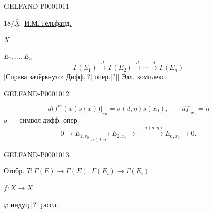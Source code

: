 \begin{GelfandAdjacentEvidence}{GELFAND-P000101}{1}

$18/\overline{\underline X}$. \underline{И.М. Гельфанд.}
\par\hspace*{4mm}$X$

$E_1,\ldots,E_n$
\begin{equation*}
\Gamma(E_1)\overset d\longrightarrow\Gamma(E_2)
\overset d\longrightarrow\cdots\overset d\longrightarrow\Gamma(E_n)
\end{equation*}
[Справа зачёркнуто: Дифф.[?] опер.[?]] Элл. комплекс.
\end{GelfandAdjacentEvidence}
\begin{GelfandAdjacentEvidence}{GELFAND-P000101}{2}

\begin{equation*}
d\bigl(f^m(x)s(x)\bigr)\big|_{x_0}=\sigma(d,\eta)s(x_0),
\qquad df\big|_{x_0}=\eta
\end{equation*}
$\sigma$ — символ дифф. опер.
\begin{equation*}
0\longrightarrow E_{1,x_0}\underset{\sigma(d,\eta)}\longrightarrow E_{2,x_0}
\longrightarrow\cdots\overset{\sigma(d,\eta)}\longrightarrow E_{n,x_0}\longrightarrow0.
\end{equation*}
\end{GelfandAdjacentEvidence}
\begin{GelfandAdjacentEvidence}{GELFAND-P000101}{3}

\underline{Отобр.} $T:\Gamma(E)\longrightarrow\Gamma(E)$.
\hfill$\Gamma(E_i)\longrightarrow\Gamma(E_i)$

$f:X\longrightarrow X$

$\varphi$ индуц.[?] рассл.
\end{GelfandAdjacentEvidence}

